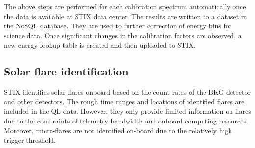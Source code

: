 \documentclass[referee]{aa} %
\begin{document}
The above steps are performed for each calibration spectrum automatically once the data is available at STIX data center. 
 The results are written to a dataset in the NoSQL database. 
 They are used to further correction of energy bins for science data.  
Once significant changes in the calibration factors are 
observed,  a new energy lookup table is created 
and then uploaded to STIX.


\subsection{Solar flare identification}

STIX identifies solar flares onboard based on the
 count rates of the BKG detector and other detectors.
The rough time ranges and locations of identified flares are included in the QL data.
However,  they only provide limited information on flares due to the constraints of telemetry 
bandwidth and onboard computing resources. Moreover, micro-flares are not identified on-board 
due to the relatively high trigger threshold.
\end{document}
